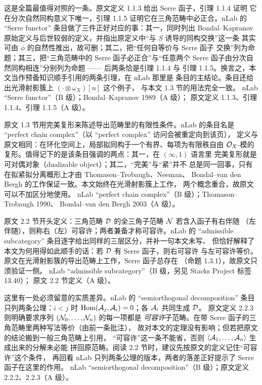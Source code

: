 \begin{conceptlist}
%
{这是全篇最值得对照的一条。原文定义 1.1.3 给出 Serre 函子，引理 1.1.4 证明
它在分次自然同构意义下唯一，引理 1.1.5 证明它在三角范畴中必正合。nLab 的
“Serre functor” 条目做了三件正好对应的事：其一，同时列出 Bondal--Kapranov
原始定义与后世较弱的定义，并指出原定义中“与 $S$ 诱导的同构交换”这一条
其实可由 $\phi$ 的自然性推出，故可删；其二，把“任何自等价与 Serre 函子
交换”列为命题；其三，把“三角范畴中的 Serre 函子必正合”与“任意两个
Serre 函子由分次自然同构相连”分别列为命题 —— 后两条恰是引理 1.1.4 与
引理 1.1.5。换言之，本文当作预备知识顺手引用的两条引理，在 nLab 那里是
条目的主结论。条目还给出光滑射影簇上 $(\cdot\otimes\omega_X)[n]$ 这个例子，
与本文 1.3 节的用法完全一致。}%
{nLab “Serre functor”（B 级）；Bondal--Kapranov 1989（A 级）；
原文定义 1.1.3、引理 1.1.4、引理 1.1.5（A 级）。}

%
{原文 1.3 节用完美复形来陈述导出范畴里的有限性条件。nLab 的条目名是
“perfect chain complex”（以 “perfect complex” 访问会被重定向到该页），
定义与原文相同：在环化空间上，局部拟同构于一个有界、每项为有限秩自由
$\mathcal{O}_X$-模的复形。值得记下的是该条目强调的两点：其一，在 $(\infty,1)$ 语言里
完美复形就是可对偶对象（dualizable object）；其二，“完美”与“紧”并不
总是同一回事，只有在拟紧拟分离概形上才由 Thomason--Trobaugh、Neeman、
Bondal--van den Bergh 的工作保证一致。本文始终在光滑射影簇上工作，
两个概念重合，故原文可以不加区分地使用。}%
{nLab “perfect chain complex”（B 级）；Thomason--Trobaugh 1990、
Bondal--van den Bergh 2003（A 级）。}

%
{原文 2.2 节开头定义：三角范畴 $\mathcal{D}$ 的全三角子范畴 $\mathcal{N}$ 若含入函子有右伴随
（左伴随），则称右（左）可容许；两者兼备才称可容许。nLab 的
“admissible subcategory” 条目逐字给出同样的三层区分，并补一句本文未写、
但恰好解释了本文为何用得如此顺手的话：若 $\mathcal{D}$ 有 Serre 函子，则右可容许
与左可容许等价。原文在光滑射影簇的导出范畴上工作，Serre 函子总存在
（命题 1.3.1），故原文只须验证一侧。}%
{nLab “admissible subcategory”（B 级，另见 Stacks Project 标签 13.40）；
原文 2.2 节定义（A 级）。}

%
{这里有一处必须留意的实质差异。nLab 的 “semiorthogonal decomposition” 条目
只列两条公理：$i<j$ 时 $\operatorname{Hom}(\mathcal{A}_j,\mathcal{A}_i)=0$；各 $\mathcal{A}_i$ 共同生成 $\mathcal{D}$。
原文定义 2.2.3 则明确要求序列 $(\mathcal{N}_0,\dots,\mathcal{N}_n)$ 的每一项都是
\emph{可容许}子范畴。在带 Serre 函子的三角范畴里两种写法等价（由前一条批注），
故对本文的定理没有影响；但若把原文的结论搬到一般三角范畴上引用，
“可容许”这一条不能省，否则 $\langle\mathcal{A}_1,\dots,\mathcal{A}_n\rangle$ 生成出来的分解未必能
拼回原范畴。阅读 2.2 节时，建议先按原文的定义记住“可容许”这个条件，
再回看 nLab 只列两条公理的版本，两者的落差正好提示了 Serre 函子在这里的作用。}%
{nLab “semiorthogonal decomposition”（B 级）；原文定义 2.2.2、2.2.3（A 级）。}


\end{conceptlist}

